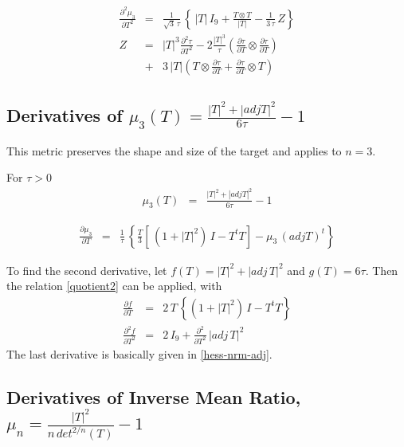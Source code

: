 \documentclass{report}
\begin{document}
\begin{eqnarray}
\frac{\partial^2 \mu_3}{\partial T^2} & = & \frac{1}{\sqrt{3} \, \tau} \, \left\{ \, |T| \, I_9 + \frac{T \otimes T}{|T|} - \frac{1}{3 \, \tau} \, Z \right\} \\
Z & = & |T|^3 \frac{\partial^2 \tau}{\partial T^2} - 2 \frac{|T|^3}{\tau} \left( \frac{\partial \tau}{\partial T} \otimes \frac{\partial \tau}{\partial T} \right) \nonumber \\
 & + & 3 \, |T| \left( T \otimes \frac{\partial \tau}{\partial T} + \frac{\partial \tau}{\partial T} \otimes T \right)
\end{eqnarray}

\subsection{Derivatives of $\mu_3(T)=\frac{|T|^2 + |adj T|^2}{6 \tau} - 1$ \label{ss+3d} }

\noindent This metric preserves the shape and size of the target and applies
to $n=3$. \newline

\noindent For $\tau>0$
\begin{eqnarray}
\mu_3 (T) & = & \frac{|T|^2 + |adj T|^2}{6 \tau} - 1
\end{eqnarray}

\begin{eqnarray}
\frac{\partial \mu_3}{\partial T} & = & \frac{1}{\tau} \, \left\{ \frac{T}{3} \left[ \, (1+|T|^2) \, I - T^t T \right] - \mu_3 \, (adj T)^t \right\}
\end{eqnarray}

\noindent To find the second derivative, let $f(T)=|T|^2 + |adj \, T|^2$ and
$g(T)=6 \tau$.  Then the relation \ref{quotient2} can be applied, with
\begin{eqnarray}
\frac{\partial f}{\partial T} & = & 2 \, T \, \left\{ \left( 1 + |T|^2 \right) \, I - T^t T \right\} \\
\frac{\partial^2 f}{\partial T^2} & = & 2 \, I_9 + \frac{\partial^2}{\partial T^2} \, |adj \, T|^2
\end{eqnarray}
The last derivative is basically given in \ref{hess-nrm-adj}. \newline

\subsection{Derivatives of Inverse Mean Ratio, $\mu_n = \frac{|T|^2}{n \, det^{2/n}(T)}-1$ \label{imr}}
\end{document}
